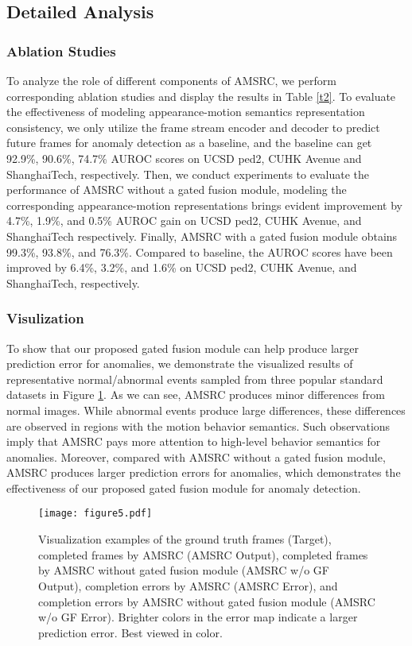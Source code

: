 \documentclass[sigconf]{acmart}
\begin{document}
\subsection{Detailed Analysis}
\subsubsection{Ablation Studies}
To analyze the role of different components of AMSRC, we perform corresponding ablation studies and display the results in Table \ref{t2}. To evaluate the effectiveness of modeling appearance-motion semantics representation consistency, we only utilize the frame stream encoder and decoder to predict future frames for anomaly detection as a baseline, and the baseline can get 92.9\%, 90.6\%, 74.7\% AUROC scores on UCSD ped2, CUHK Avenue and ShanghaiTech, respectively. Then, we conduct experiments to evaluate the performance of AMSRC without a gated fusion module, modeling the corresponding appearance-motion representations brings evident improvement by 4.7\%, 1.9\%, and 0.5\% AUROC gain on UCSD ped2, CUHK Avenue, and ShanghaiTech respectively. Finally, AMSRC with a gated fusion module obtains 99.3\%, 93.8\%, and 76.3\%. Compared to baseline, the AUROC scores have been improved by 6.4\%, 3.2\%, and 1.6\% on UCSD ped2, CUHK Avenue, and ShanghaiTech, respectively.
\subsubsection{Visulization}
To show that our proposed gated fusion module can help produce larger prediction error for anomalies, we demonstrate the visualized results of representative normal/abnormal events sampled from three popular standard datasets in Figure \ref{p6}. As we can see, AMSRC produces minor differences from normal images. While abnormal events produce large differences, these differences are observed in regions with the motion behavior semantics. Such observations imply that AMSRC pays more attention to high-level behavior semantics for anomalies. Moreover, compared with AMSRC without a gated fusion module, AMSRC produces larger prediction errors for anomalies, which demonstrates the effectiveness of our proposed gated fusion module for anomaly detection.
\begin{figure}[ht]
	\centering
	\texttt{[image: figure5.pdf]}
	\caption{Visualization examples of the ground truth frames (Target), completed frames by AMSRC (AMSRC Output), completed frames by AMSRC without gated fusion module (AMSRC w/o GF Output), completion errors by AMSRC (AMSRC Error), and completion errors by AMSRC without gated fusion module (AMSRC w/o GF Error). Brighter colors in the error map indicate a larger prediction error. Best viewed in color.}
	\label{p6}
\end{figure}
\end{document}
